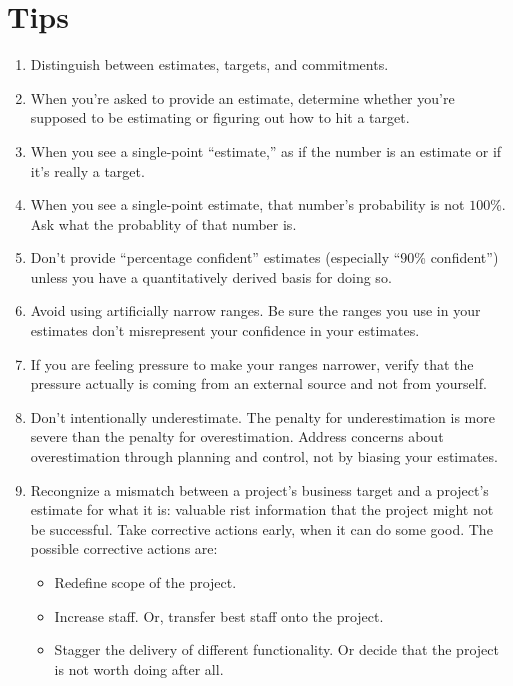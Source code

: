\documentclass[12pt]{article}
\begin{document}
\section*{Tips}
\begin{enumerate}

\item Distinguish between estimates, targets, and commitments.
\item When you're asked to provide an estimate, determine whether you're supposed to be estimating or figuring out how to hit a target.
\item When you see a single-point ``estimate,'' as if the number is an estimate or if it's really a target.
\item When you see a single-point estimate, that number's probability is not $100$\%. Ask what the probablity of that number is.
\item Don't provide ``percentage confident'' estimates (especially ``$90$\% confident'') unless you have a quantitatively derived basis for doing so.

\item Avoid using artificially narrow ranges. Be sure the ranges you use in your estimates don't misrepresent your confidence in your estimates.

\item If you are feeling pressure to make your ranges narrower, verify that the pressure actually is coming from an external source and not from yourself.

\item Don't intentionally underestimate. The penalty for underestimation is more severe than the penalty for overestimation. Address concerns about overestimation through planning and control, not by biasing your estimates.

\item Recongnize a mismatch between a project's business target and a project's estimate for what it is: valuable rist information that the project might not be successful. Take corrective actions early, when it can do some good. The possible corrective actions are:
\begin{itemize}
	\item Redefine scope of the project.
	\item Increase staff. Or, transfer best staff onto the project.
	\item Stagger the delivery of different functionality. Or decide that the project is not worth doing after all.
\end{itemize}
\end{enumerate}
\end{document}
